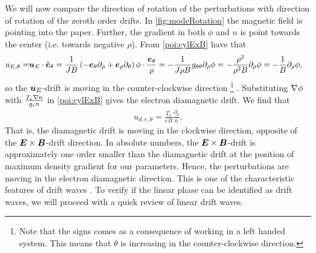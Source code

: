 We will now compare the direction of rotation of the perturbations with direction of rotation of the zeroth order drifts.
In \cref{fig:modeRotation} the magnetic field is pointing into the paper.
Further, the gradient in both $\phi$ and $n$ is point towards the center (i.e. towards negative $\rho$).
From \cref{poi:cylExB} have that
%
\begin{align*}
    u_{E,\theta} =& \boldsymbol{u}_{E}\cdot\hat{\boldsymbol{e}}_\theta
    =
     \frac{1}{JB}
           \left(
           - \boldsymbol{e}_\theta\partial_\rho
           + \boldsymbol{e}_\rho\partial_\theta
           \right)
           \phi
    \cdot
    \frac{\boldsymbol{e}_\theta}{\rho}
    =
     - \frac{1}{J\rho B} g_{\theta\theta} \partial_\rho \phi
    =
     - \frac{\rho^2}{\rho^2 B} \partial_\rho \phi
    =
     - \frac{1}{B} \partial_\rho \phi,
\end{align*}
%
so the $\boldsymbol{u}_E$-drift is moving in the counter-clockwise direction%
\footnote{
Note that the signs comes as a consequence of working in a left handed system.
This means that $\theta$ is increasing in the counter-clockwise direction.
}
%
.
Substituting $\nabla\phi$ with $\frac{T_e\nabla n}{q_en}$ in \cref{poi:cylExB} gives the electron diamagnetic drift.
We find that
%
\begin{align*}
 u_{d,e,\theta}= \frac{T_e}{eB} \frac{\partial_\rho}{n}.
\end{align*}
%
That is, the diamagnetic drift is moving in the clockwise direction, opposite of the $\boldsymbol{E}\times\boldsymbol{B}$-drift direction.
In absolute numbers, the $\boldsymbol{E}\times\boldsymbol{B}$-drift is approximately one order smaller than the diamagnetic drift at the position of maximum density gradient for our parameters.
Hence, the perturbations are moving in the electron diamagnetic direction.
This is one of the characteristic features of drift waves \cite{Jassby1972}.
To verify if the linear phase can be identified as drift waves, we will proceed with a quick review of linear drift waves.

